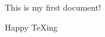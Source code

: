 \documentclass{article}
\begin{document}
	
		This is my first document!
		
		Happy \TeX ing	
	
	
\end{document}
